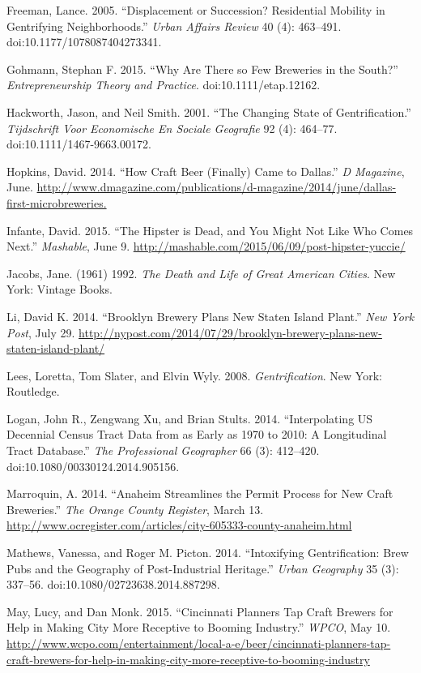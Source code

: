 \documentclass[]{article}
\begin{document}
Freeman, Lance. 2005. ``Displacement or Succession? Residential Mobility
in Gentrifying Neighborhoods.'' \emph{Urban Affairs Review} 40 (4):
463--491. doi:10.1177/1078087404273341.

Gohmann, Stephan F. 2015. ``Why Are There so Few Breweries in the
South?'' \emph{Entrepreneurship Theory and Practice}.
doi:10.1111/etap.12162.

Hackworth, Jason, and Neil Smith. 2001. ``The Changing State of
Gentrification.'' \emph{Tijdschrift Voor Economische En Sociale
Geografie} 92 (4): 464--77. doi:10.1111/1467-9663.00172.

Hopkins, David. 2014. ``How Craft Beer (Finally) Came to Dallas.''
\emph{D Magazine}, June.
\url{http://www.dmagazine.com/publications/d-magazine/2014/june/dallas-first-microbreweries.}

Infante, David. 2015. ``The Hipster is Dead, and You Might Not Like Who
Comes Next.'' \emph{Mashable}, June 9.
\url{http://mashable.com/2015/06/09/post-hipster-yuccie/}

Jacobs, Jane. (1961) 1992. \emph{The Death and Life of Great American
Cities}. New York: Vintage Books.

Li, David K. 2014. ``Brooklyn Brewery Plans New Staten Island Plant.''
\emph{New York Post}, July 29.
\url{http://nypost.com/2014/07/29/brooklyn-brewery-plans-new-staten-island-plant/}

Lees, Loretta, Tom Slater, and Elvin Wyly. 2008. \emph{Gentrification}.
New York: Routledge.

Logan, John R., Zengwang Xu, and Brian Stults. 2014. ``Interpolating US
Decennial Census Tract Data from as Early as 1970 to 2010: A
Longitudinal Tract Database.'' \emph{The Professional Geographer} 66
(3): 412--420. doi:10.1080/00330124.2014.905156.

Marroquin, A. 2014. ``Anaheim Streamlines the Permit Process for New
Craft Breweries.'' \emph{The Orange County Register}, March 13.
\url{http://www.ocregister.com/articles/city-605333-county-anaheim.html}

Mathews, Vanessa, and Roger M. Picton. 2014. ``Intoxifying
Gentrification: Brew Pubs and the Geography of Post-Industrial
Heritage.'' \emph{Urban Geography} 35 (3): 337--56.
doi:10.1080/02723638.2014.887298.

May, Lucy, and Dan Monk. 2015. ``Cincinnati Planners Tap Craft Brewers
for Help in Making City More Receptive to Booming Industry.''
\emph{WPCO}, May 10.
\url{http://www.wcpo.com/entertainment/local-a-e/beer/cincinnati-planners-tap-craft-brewers-for-help-in-making-city-more-receptive-to-booming-industry}
\end{document}
